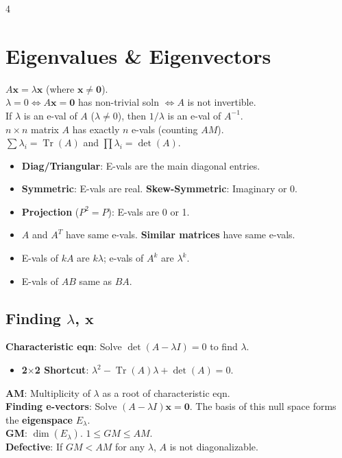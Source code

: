 \documentclass[9pt]{extarticle}
\begin{document}
\begin{multicols*}{4}
\section*{Eigenvalues \& Eigenvectors}
$A\mathbf{x}=\lambda\mathbf{x}$ (where $\mathbf{x}\ne \mathbf{0}$).\\
$\lambda=0 \Leftrightarrow A\mathbf{x}=\mathbf{0}$ has non-trivial soln $\Leftrightarrow A$ is not invertible.\\
If $\lambda$ is an e-val of $A$ ($\lambda\ne 0$), then $1/\lambda$ is an e-val of $A^{-1}$.\\
$n\times n$ matrix $A$ has exactly $n$ e-vals (counting $AM$).\\
$\sum \lambda_{i}=\operatorname{Tr}(A)$ and $\prod \lambda_{i}=\det(A)$.\\
\begin{itemize}
    \item \textbf{Diag/Triangular}: E-vals are the main diagonal entries.
    \item \textbf{Symmetric}: E-vals are real. \textbf{Skew-Symmetric}: Imaginary or 0.
    \item \textbf{Projection} ($P^2=P$): E-vals are 0 or 1.
    \item $A$ and $A^T$ have same e-vals. \textbf{Similar matrices} have same e-vals.
    \item E-vals of $kA$ are $k\lambda$; e-vals of $A^k$ are $\lambda^k$.
    \item E-vals of $AB$ same as $BA$.
\end{itemize}

\subsection*{Finding $\lambda$, $\mathbf{x}$}
\textbf{Characteristic eqn}: Solve $\det(A-\lambda I)=0$ to find $\lambda$.
\begin{itemize}
    \item \textbf{2$\times$2 Shortcut}: $\lambda^{2}-\operatorname{Tr}(A)\lambda+\det(A)=0$.
\end{itemize}
\textbf{AM}: Multiplicity of $\lambda$ as a root of characteristic eqn.\\
\textbf{Finding e-vectors}: Solve $(A-\lambda I)\mathbf{x}=\mathbf{0}$. The basis of this null space forms the \textbf{eigenspace} $E_\lambda$.\\
\textbf{GM}: $\dim(E_\lambda)$. $1 \le GM \le AM$.\\
\textbf{Defective}: If $GM < AM$ for any $\lambda$, $A$ is not diagonalizable.


\end{multicols*}
\end{document}
